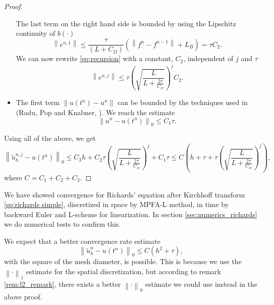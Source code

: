 \documentclass[../Main/main.tex]{subfiles}
\begin{document}
\begin{proof}
\begin{itemize}
\begin{equation}
		\end{equation}
		The last term on the right hand side is bounded by using the Lipschitz continuity of $b(\cdot)$
		\begin{equation}
			\left \|e^{n,1}\right \| \leq \frac{\tau}{(L+C_{\Omega})}\left( \left \|f^n-f^{n-1}\right \|+L_B\right)=\tau C_2.
		\end{equation} 
		We can now rewrite \eqref{eq:recursion} with a constant, $C_2$, independent of $j$ and $\tau$
\begin{equation}
	\left \|e^{n,j}\right \| \leq \tau \left(\sqrt{\frac{L}{L+\frac{2\tau}{C_{\Omega}}}} \right)^j  C_2.
\end{equation}
		\item The first term $\left \| u(t^n)-u^n\right \|$ can be bounded by the techniques used in (Radu, Pop and Knabner, \cite{FlorinTimeConvergence}). We reach the estimate
		\begin{equation}
			\left \| u^n-u(t^n)\right \|_0 \leq C_1 \tau.
		\end{equation}
		
		\end{itemize}
	Using all of the above, we get
	\begin{equation}
		\left \|\tilde{u}_h^{n,j}-u(t^n)\right \|_0 \leq C_3 h + C_2\tau \left(\sqrt{\frac{L}{L+\frac{2\tau}{C_{\Omega}}}} \right)^j + C_1 \tau \leq C \left(h+\tau+ \tau \left(\sqrt{\frac{L}{L+\frac{2\tau}{C_{\Omega}}}} \right)^j\right ),
	\end{equation}
	where $C=C_1+C_2+C_3$.
	\end{proof}
	We have showed convergence for Richards' equation after Kirchhoff transform \eqref{eq:richards simple},  discretized in space by MPFA-L method, in time by backward Euler and L-scheme for linearization. In section \ref{sec:numerics_richards} we do numerical tests to confirm this.
	\begin{remark}
		We expect that a better convergence rate estimate 
		\begin{equation}
			\left \|\tilde{u}_h^{n}-u(t^n)\right \|_0 \leq C (h^2+\tau),
		\end{equation}
		with the square of the mesh diameter, is possible. This is because we use the $\left\|\cdot\right\|_1$ estimate for the spatial discretization, but according to remark \ref{rem:l2_remark}, there exists a better $\left\|\cdot\right\|_0$ estimate we could use instead in the above proof.
	\end{remark}
	
\end{document}
